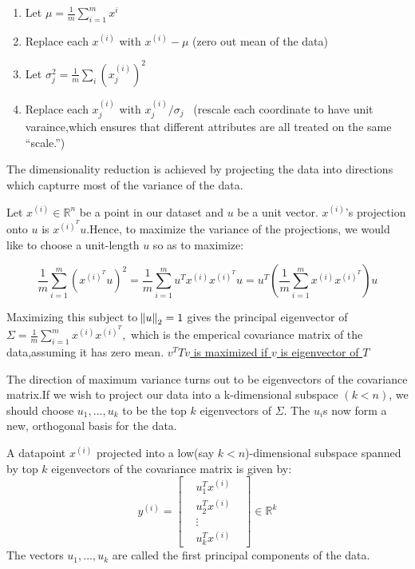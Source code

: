 \documentclass[12pt]{article}
\begin{document}
\begin{enumerate}
	\item Let $\mu  = \frac{1}{m} \sum_{i=1}^{m}x^{i}$
	\item Replace each $x^{(i)}$ with $x^{(i)}-\mu$ (zero out mean of the data)
	\item Let $\sigma _{j}^{2} = \frac{1}{m} \sum_{i}(x_{j}^{(i)})^{2}$
	\item  Replace each $x_{j}^{(i)}$ with $x_{j}^{(i)} /  \sigma_{j}$ \ (rescale each coordinate to have unit varaince,which ensures that different attributes are all treated on the same
	“scale.”)
\end{enumerate}

The dimensionality reduction is achieved by projecting the data into directions which capturre most of the variance of the data.

Let $x^{(i)} \in \mathbb{R}^{n}$ be a point in our dataset and $u$ be a unit vector. $x^{(i)}$'s projection onto $u$ is $x^{(i)^T}u$.Hence, to maximize the variance of the projections, we would like to choose a unit-length $u$ so as to maximize:
 
 $$\frac{1}{m} \sum_{i=1}^{m}(x^{(i)^T}u)^{2} = \frac{1}{m} \sum_{i=1}^{m} u^{T}x^{(i)}x^{(i)^T}u = u^{T} \left(\frac{1}{m} \sum_{i=1}^{m} x^{(i)}x^{(i)^T} \right)u$$
 
 Maximizing this subject to  $\norm{u}_{2}=1$ gives the principal eigenvector of $\Sigma = \frac{1}{m} \sum_{i=1}^{m} x^{(i)}x^{(i)^T} ,$ which is the emperical covariance matrix of the data,assuming it has zero mean. \href{https://math.stackexchange.com/questions/1199852/maximize-the-value-of-vtav}{$v^{T}Tv$ is maximized if $v$ is eigenvector of $T$}
 
 The direction of maximum variance turns out to be eigenvectors of the covariance matrix.If we wish to project our data into a k-dimensional subspace $(k < n)$, we should choose $u_{1}, ..., u_{k}$ to be the top $k$ eigenvectors of $\Sigma$. The $u_{i}$s now form a new, orthogonal basis for the data.
 
 A datapoint $x^{(i)}$ projected into a low(say $k<n$)-dimensional subspace  spanned by top $k$ eigenvectors of the covariance matrix is given by:
 $$y^{(i)} =\begin{bmatrix} 
 	& u_{1}^{T}x^{(i)} &  \\
 	& u_{2}^{T}x^{(i)} &\\
 	& \vdots & \\
 	& u_{k}^{T}x^{(i)} &
 \end{bmatrix}  \in \mathbb{R}^{k}$$
 The vectors  $u_{1}, ..., u_{k}$ are called the first principal components of the data.
 
\end{document}
